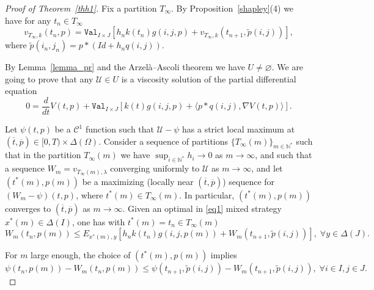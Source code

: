 \documentclass[english,openary,12pt]{article}
\renewcommand{\emptyset}{\varnothing}
\theoremstyle{definition}
\newcommand{\N}{\mathbb{N}}
\begin{document}
\begin{proof}[Proof of Theorem~\ref{thh1}]
Fix a partition $T_\infty$. By Proposition~\ref{shapley}(4) we have
for any $t_n \in T_\infty$
\begin{equation}
\label{eq1}
v_{T_\infty,k}(t_n,p) = \texttt{Val}_{I\times J} 
\left[h_n k(t_n) g(i,j,p) + v_{T_\infty,k}(t_{n+1},
\widetilde p(i,j))\right],
\end{equation}
where $\widetilde p(i_n,j_n) = p*(Id + h_n q(i,j))$. 

By Lemma~\ref{lemma_pr} and the Arzelà–Ascoli theorem we have $U\neq \emptyset$.
We are going to prove that any $\mathcal U \in U$
is a viscosity solution of the partial differential equation
$$0 = \frac{d}{dt} V(t,p) + \texttt{Val}_{I \times J} 
[k(t) g(i,j,p) + \langle p * q(i,j), \nabla V(t,p) \rangle].$$

Let $\psi(t,p)$ be a $\mathcal C^1$ function such that $\mathcal{U} - \psi$ 
has a strict local maximum at 
$(\overline t, \overline p) \in [0,T) \times \Delta(\Omega)$. 
Consider a sequence of partitions $\{T_\infty(m)\}_{m \in \N^*}$ 
such that in the partition $T_\infty(m)$ we have 
$\sup_{i\in\N^*} h_i \to 0$ as $m \to \infty$, and such that a sequence 
$W_m = v_{T_\infty(m),\lambda}$ converging uniformly
to $\mathcal U$ as $m \to \infty$, and let 
$(t^*(m), p(m))$ be a maximizing (locally near $(\overline t, \overline p)$) 
sequence for $(W_m - \psi)(t,p)$, where $t^*(m) \in T_\infty(m)$. 
In particular, $(t^*(m), p(m))$ converges to $(\overline t, \overline p)$ as 
$m \to \infty.$ Given an optimal in \eqref{eq1} mixed strategy 
$x^*(m) \in \Delta(I)$, 
one has with 
$t^*(m)=t_n \in T_\infty(m)$
$$W_m(t_n, p(m)) \le E_{x^*(m),y}
\left[h_n k(t_n) g(i,j,p(m)) + W_m(t_{n+1},\widetilde p
(i,j))\right], \; \forall y \in \Delta(J).
$$

For $m$ large enough, the choice of $(t^*(m),p(m))$ implies
$$\psi(t_n,p(m)) - W_m(t_n, p(m)) \le 
\psi(t_{n+1},\widetilde p(i,j)) - W_m(t_{n+1},\widetilde p
(i,j)), \; \forall i \in I, j \in J.$$


\end{proof}
\end{document}
